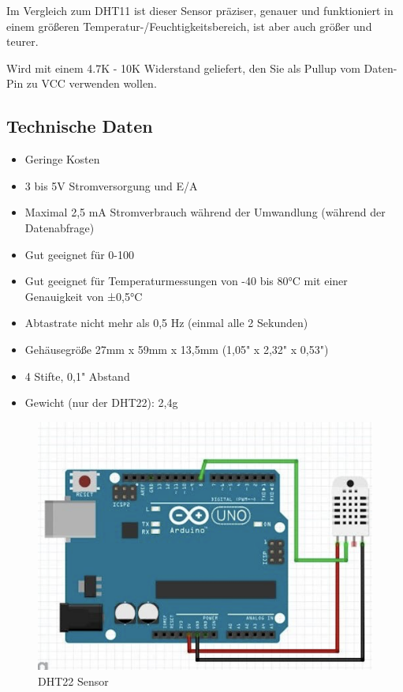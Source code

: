 \documentclass[conference]{IEEEtran}
\begin{document}
Im Vergleich zum DHT11 ist dieser Sensor präziser, genauer und funktioniert in einem größeren Temperatur-/Feuchtigkeitsbereich, ist aber auch größer und teurer.

Wird mit einem 4.7K - 10K Widerstand geliefert, den Sie als Pullup vom Daten-Pin zu VCC verwenden wollen.

\subsection{Technische Daten}
\begin{itemize}
	\item Geringe Kosten
	\item 3 bis 5V Stromversorgung und E/A
	\item Maximal 2,5 mA Stromverbrauch während der Umwandlung (während der Datenabfrage)
	\item Gut geeignet für 0-100%
	\item Gut geeignet für Temperaturmessungen von -40 bis 80°C mit einer Genauigkeit von ±0,5°C
	\item Abtastrate nicht mehr als 0,5 Hz (einmal alle 2 Sekunden)
	\item Gehäusegröße 27mm x 59mm x 13,5mm (1,05" x 2,32" x 0,53")
	\item 4 Stifte, 0,1" Abstand 
	\item Gewicht (nur der DHT22): 2,4g
\end{itemize}

	
\begin{figure}
	\begin{center}
		\includegraphics[scale=0.4]{dht22}
	\end{center}
	\caption{DHT22 Sensor}
\end{figure}
\end{document}
